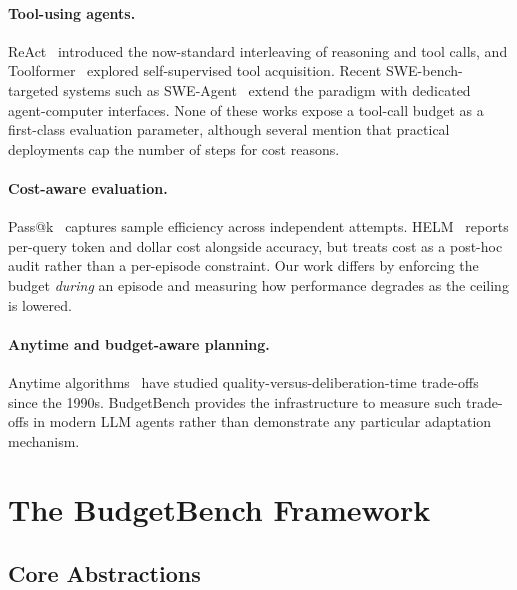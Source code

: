 \documentclass[11pt]{article}
\begin{document}
\paragraph{Tool-using agents.}
ReAct~\cite{yao2023react} introduced the now-standard interleaving of
reasoning and tool calls, and Toolformer~\cite{schick2023toolformer} explored
self-supervised tool acquisition. Recent SWE-bench-targeted systems such
as SWE-Agent~\cite{yang2024sweagent} extend the paradigm with dedicated
agent-computer interfaces. None of these works expose a tool-call budget
as a first-class evaluation parameter, although several mention that
practical deployments cap the number of steps for cost reasons.

\paragraph{Cost-aware evaluation.}
Pass@k~\cite{chen2021codex} captures sample efficiency across independent
attempts. HELM~\cite{liang2023helm} reports per-query token and dollar cost
alongside accuracy, but treats cost as a post-hoc audit rather than a
per-episode constraint. Our work differs by enforcing the budget
\emph{during} an episode and measuring how performance degrades as the
ceiling is lowered.

\paragraph{Anytime and budget-aware planning.}
Anytime algorithms~\cite{zilberstein1996anytime} have studied
quality-versus-deliberation-time trade-offs since the 1990s.
BudgetBench provides the infrastructure to measure such trade-offs in
modern LLM agents rather than demonstrate any particular adaptation
mechanism.


\section{The BudgetBench Framework}
\label{sec:framework}

\subsection{Core Abstractions}
\label{sec:framework:abstractions}
\end{document}
